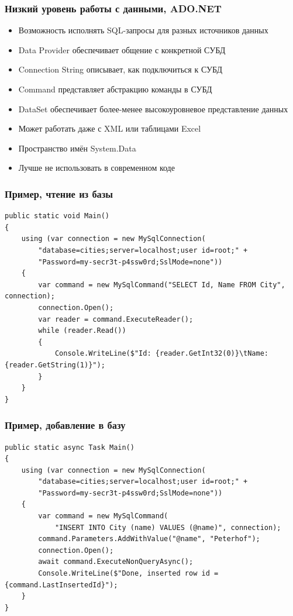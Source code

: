 \documentclass{../../slides-style}
\begin{document}
    \begin{frame}
        \frametitle{Низкий уровень работы с данными, ADO.NET}
        \begin{itemize}
            \item Возможность исполнять SQL-запросы для разных источников данных
            \item Data Provider обеспечивает общение с конкретной СУБД
            \item Connection String описывает, как подключиться к СУБД
            \item Command представляет абстракцию команды в СУБД
            \item DataSet обеспечивает более-менее высокоуровневое представление данных
            \item Может работать даже с XML или таблицами Excel
            \item Пространство имён System.Data
            \item Лучше не использовать в современном коде
        \end{itemize}
    \end{frame}

    \begin{frame}[fragile]
        \frametitle{Пример, чтение из базы}
        \begin{footnotesize}
            \begin{verbatim}
public static void Main()
{
    using (var connection = new MySqlConnection(
        "database=cities;server=localhost;user id=root;" + 
        "Password=my-secr3t-p4ssw0rd;SslMode=none"))
    {
        var command = new MySqlCommand("SELECT Id, Name FROM City", connection);
        connection.Open();
        var reader = command.ExecuteReader();
        while (reader.Read())
        {
            Console.WriteLine($"Id: {reader.GetInt32(0)}\tName:{reader.GetString(1)}");
        }
    }
}
            \end{verbatim}
        \end{footnotesize}
    \end{frame}

    \begin{frame}[fragile]
        \frametitle{Пример, добавление в базу}
        \begin{footnotesize}
            \begin{verbatim}
public static async Task Main()
{
    using (var connection = new MySqlConnection(
        "database=cities;server=localhost;user id=root;" +
        "Password=my-secr3t-p4ssw0rd;SslMode=none"))
    {
        var command = new MySqlCommand(
            "INSERT INTO City (name) VALUES (@name)", connection);
        command.Parameters.AddWithValue("@name", "Peterhof");
        connection.Open();
        await command.ExecuteNonQueryAsync();
        Console.WriteLine($"Done, inserted row id = {command.LastInsertedId}");
    }
}
            \end{verbatim}
        \end{footnotesize}
    \end{frame}
\end{document}
